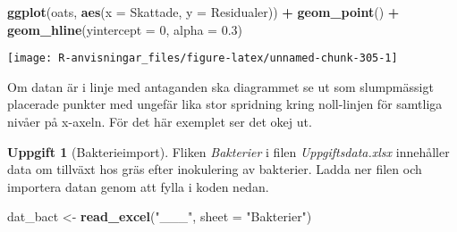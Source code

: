 \documentclass[
]{book}
\newenvironment{Shaded}{\begin{snugshade}}{\end{snugshade}}
\newcommand{\AttributeTok}[1]{\textcolor[rgb]{0.13,0.29,0.53}{#1}}
\newcommand{\DecValTok}[1]{\textcolor[rgb]{0.00,0.00,0.81}{#1}}
\newcommand{\FloatTok}[1]{\textcolor[rgb]{0.00,0.00,0.81}{#1}}
\newcommand{\FunctionTok}[1]{\textcolor[rgb]{0.13,0.29,0.53}{\textbf{#1}}}
\newcommand{\NormalTok}[1]{#1}
\newcommand{\OtherTok}[1]{\textcolor[rgb]{0.56,0.35,0.01}{#1}}
\newcommand{\SpecialCharTok}[1]{\textcolor[rgb]{0.81,0.36,0.00}{\textbf{#1}}}
\newcommand{\StringTok}[1]{\textcolor[rgb]{0.31,0.60,0.02}{#1}}
\theoremstyle{definition}
\theoremstyle{definition}
\theoremstyle{definition}
\newtheorem{exercise}{Uppgift}[chapter]
\theoremstyle{definition}
\theoremstyle{remark}
\begin{document}
\begin{Shaded}
\begin{Highlighting}[]
\FunctionTok{ggplot}\NormalTok{(oats, }\FunctionTok{aes}\NormalTok{(}\AttributeTok{x =}\NormalTok{ Skattade, }\AttributeTok{y =}\NormalTok{ Residualer)) }\SpecialCharTok{+}
  \FunctionTok{geom\_point}\NormalTok{() }\SpecialCharTok{+}
  \FunctionTok{geom\_hline}\NormalTok{(}\AttributeTok{yintercept =} \DecValTok{0}\NormalTok{, }\AttributeTok{alpha =} \FloatTok{0.3}\NormalTok{)}
\end{Highlighting}
\end{Shaded}

\begin{center}\texttt{[image: R-anvisningar\_files/figure-latex/unnamed-chunk-305-1]} \end{center}

Om datan är i linje med antaganden ska diagrammet se ut som slumpmässigt placerade punkter med ungefär lika stor spridning kring noll-linjen för samtliga nivåer på x-axeln. För det här exemplet ser det okej ut.

\begin{exercise}[Bakterieimport]

Fliken \emph{Bakterier} i filen \emph{Uppgiftsdata.xlsx} innehåller data om tillväxt hos gräs efter inokulering av bakterier. Ladda ner filen och importera datan genom att fylla i koden nedan.

\begin{Shaded}
\begin{Highlighting}[]
\NormalTok{dat\_bact }\OtherTok{\textless{}{-}} \FunctionTok{read\_excel}\NormalTok{(}\StringTok{"\_\_\_"}\NormalTok{, }\AttributeTok{sheet =} \StringTok{"Bakterier"}\NormalTok{)}
\end{Highlighting}
\end{Shaded}

\end{exercise}
\end{document}

